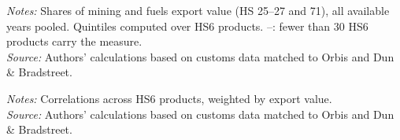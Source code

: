 \documentclass[11pt,a4paper]{article}
\begin{document}
\begin{table}[H]\centering\small%
  \caption{Mining and Fuels: Multinational Share of Export Value, by Quintile of Six Sophistication Measures}%
  \label{tab:six_t_mining}%
  \par\vspace{3pt}%
  \begin{minipage}{0.95\textwidth}\footnotesize %
  \textit{Notes:} Shares of mining and fuels export value (HS 25--27 and 71), all available years pooled. Quintiles computed over HS6 products. --: fewer than 30 HS6 products carry the measure.\\[3pt]%
  \textit{Source:} Authors' calculations based on customs data matched to Orbis and Dun \& Bradstreet.%
  \end{minipage}%
  \end{table}
\begin{table}[H]\centering\small%
  \caption{Mining and Fuels: Correlations between Sophistication Measures}%
  \label{tab:corr_mining}%
  \par\vspace{3pt}%
  \begin{minipage}{0.95\textwidth}\footnotesize %
  \textit{Notes:} Correlations across HS6 products, weighted by export value.\\[3pt]%
  \textit{Source:} Authors' calculations based on customs data matched to Orbis and Dun \& Bradstreet.%
  \end{minipage}%
  \end{table}
\end{document}
